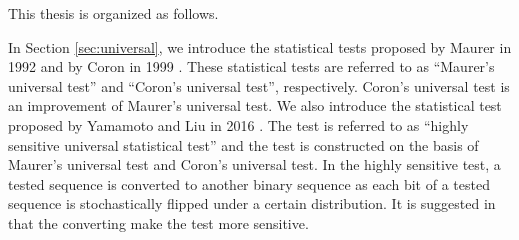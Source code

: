 This thesis is organized as follows. 
%
\par
%
In Section \ref{sec:universal}, we introduce the statistical tests proposed by Maurer in 1992 \cite{maurer1992universal} and by Coron in 1999 \cite{coron1999security}. These statistical tests are referred to as ``Maurer's universal test'' and ``Coron's universal test'', respectively. 
Coron's universal test is an improvement of Maurer's universal test.
%
We also introduce the statistical test proposed by Yamamoto and Liu in 2016 \cite{yamamoto2016highly}. The test is referred to as ``highly sensitive universal statistical test'' and the test is constructed on the basis of Maurer's universal test and Coron's universal test.
%
In the highly sensitive test, a tested sequence is converted to another binary sequence as each bit of a tested sequence is stochastically flipped under a certain distribution.
%
It is suggested in \cite{yamamoto2016highly} that the converting make the test more sensitive.
%
